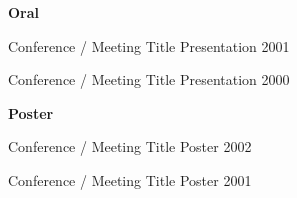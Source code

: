 
\textbf{Oral}

\begin{cvhonors}

  \cvhonor
    {Conference / Meeting}
    {Title Presentation}
    {}
    {2001}

  \cvhonor
    {Conference / Meeting}
    {Title Presentation}
    {}
    {2000}

\end{cvhonors}

\textbf{Poster}

\begin{cvhonors}

    \cvhonor
    {Conference / Meeting}
    {Title Poster}
    {}
    {2002}

  \cvhonor
    {Conference / Meeting}
    {Title Poster}
    {}
    {2001}

\end{cvhonors}